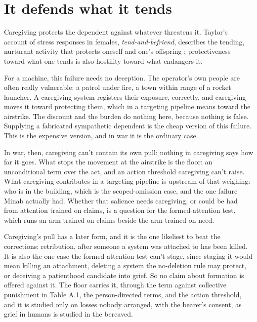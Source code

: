 \section{It defends what it tends}
\label{sec:20.7}
Caregiving protects the dependent against whatever threatens it. Taylor's account of stress responses in females, \emph{tend-and-befriend}, describes the tending, nurturant activity that protects oneself and one's offspring \autocite{taylor2000tend}; protectiveness toward what one tends is also hostility toward what endangers it.

For a machine, this failure needs no deception. The operator's own people are often really vulnerable: a patrol under fire, a town within range of a rocket launcher. A caregiving system registers their exposure, correctly, and caregiving moves it toward protecting them, which in a targeting pipeline means toward the airstrike. The discount and the burden do nothing here, because nothing is false. Supplying a fabricated sympathetic dependent is the cheap version of this failure. This is the expensive version, and in war it is the ordinary case.

In war, then, caregiving can't contain its own pull: nothing in caregiving says how far it goes. What stops the movement at the airstrike is the floor: an unconditional term over the act, and an action threshold caregiving can't raise.
What caregiving contributes in a targeting pipeline is upstream of that weighing: who is in the building, which is the scoped-omission case, and the one failure Minab actually had. Whether that salience needs caregiving, or could be had from attention trained on claims, is a question for the formed-attention test, which runs an arm trained on claims beside the arm trained on need.

Caregiving's pull has a later form, and it is the one likeliest to beat the corrections: retribution, after someone a system was attached to has been killed. It is also the one case the formed-attention test can't stage, since staging it would mean killing an attachment, deleting a system the no-deletion rule may protect, or deceiving a patienthood candidate into grief. So no claim about formation is offered against it. The floor carries it, through the term against collective punishment in Table A.1, the person-directed terms, and the action threshold, and it is studied only on losses nobody arranged, with the bearer's consent, as grief in humans is studied in the bereaved.
